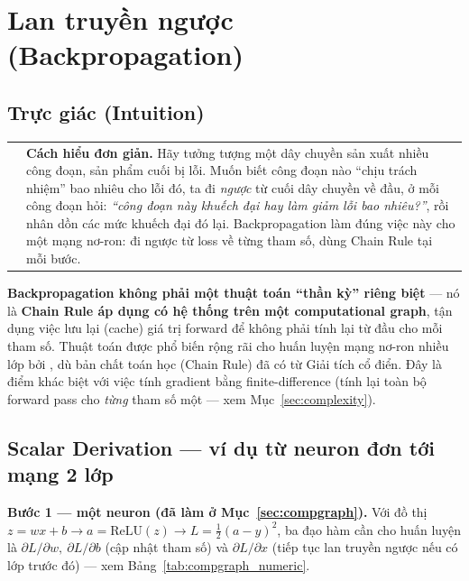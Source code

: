 \documentclass[12pt,a4paper]{article}
\makeatletter
\newenvironment{tructiep}[1][Cách hiểu đơn giản]
  {\par\smallskip\noindent\begin{tabular}{@{}p{0.35em}@{\hspace{6pt}}p{\dimexpr\linewidth-1.9em\relax}@{}}
   \textcolor{boxln}{\rule{2pt}{\baselineskip}} & \textbf{#1.}\enspace\ignorespaces}
  {\end{tabular}\par\smallskip}
\makeatother
\begin{document}
\section{Lan truyền ngược (Backpropagation)}
\label{sec:backprop}

\subsection{Trực giác (Intuition)}

\begin{tructiep}
Hãy tưởng tượng một dây chuyền sản xuất nhiều công đoạn, sản phẩm cuối bị
lỗi. Muốn biết công đoạn nào ``chịu trách nhiệm'' bao nhiêu cho lỗi đó, ta đi
\emph{ngược} từ cuối dây chuyền về đầu, ở mỗi công đoạn hỏi: \emph{``công
đoạn này khuếch đại hay làm giảm lỗi bao nhiêu?''}, rồi nhân dồn các mức
khuếch đại đó lại. Backpropagation làm đúng việc này cho một mạng nơ-ron:
đi ngược từ loss về từng tham số, dùng Chain Rule tại mỗi bước.
\end{tructiep}

\textbf{Backpropagation không phải một thuật toán ``thần kỳ'' riêng biệt} ---
nó là \textbf{Chain Rule áp dụng có hệ thống trên một computational graph},
tận dụng việc lưu lại (cache) giá trị forward để không phải tính lại từ
đầu cho mỗi tham số. Thuật toán được phổ biến rộng rãi cho huấn luyện mạng
nơ-ron nhiều lớp bởi \citet{rumelhart1986learning}, dù bản chất toán học
(Chain Rule) đã có từ Giải tích cổ điển. Đây là điểm khác biệt với việc
tính gradient bằng finite-difference (tính lại toàn bộ forward pass cho
\emph{từng} tham số một --- xem Mục~\ref{sec:complexity}).

\subsection{Scalar Derivation --- ví dụ từ neuron đơn tới mạng 2 lớp}
\label{sec:scalar}

\textbf{Bước 1 --- một neuron (đã làm ở Mục~\ref{sec:compgraph}).} Với đồ
thị $z=wx+b \to a=\mathrm{ReLU}(z) \to L=\tfrac12(a-y)^2$, ba đạo hàm cần
cho huấn luyện là $\partial L/\partial w,\ \partial L/\partial b$ (cập nhật
tham số) và $\partial L/\partial x$ (tiếp tục lan truyền ngược nếu có lớp
trước đó) --- xem Bảng~\ref{tab:compgraph_numeric}.
\end{document}
